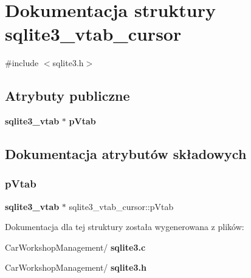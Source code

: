 \section{Dokumentacja struktury sqlite3\+\_\+vtab\+\_\+cursor}
\label{structsqlite3__vtab__cursor}


{\ttfamily \#include $<$sqlite3.\+h$>$}

\subsection*{Atrybuty publiczne}
\begin{DoxyCompactItemize}
\item 
\textbf{ sqlite3\+\_\+vtab} $\ast$ \textbf{ p\+Vtab}
\end{DoxyCompactItemize}


\subsection{Dokumentacja atrybutów składowych}
\mbox{\label{structsqlite3__vtab__cursor_a7bb57f3f9c7c618a9d6d33c6d9820bdc}} 
\subsubsection{pVtab}
{\footnotesize\ttfamily \textbf{ sqlite3\+\_\+vtab} $\ast$ sqlite3\+\_\+vtab\+\_\+cursor\+::p\+Vtab}



Dokumentacja dla tej struktury została wygenerowana z plików\+:\begin{DoxyCompactItemize}
\item 
Car\+Workshop\+Management/\textbf{ sqlite3.\+c}\item 
Car\+Workshop\+Management/\textbf{ sqlite3.\+h}\end{DoxyCompactItemize}
